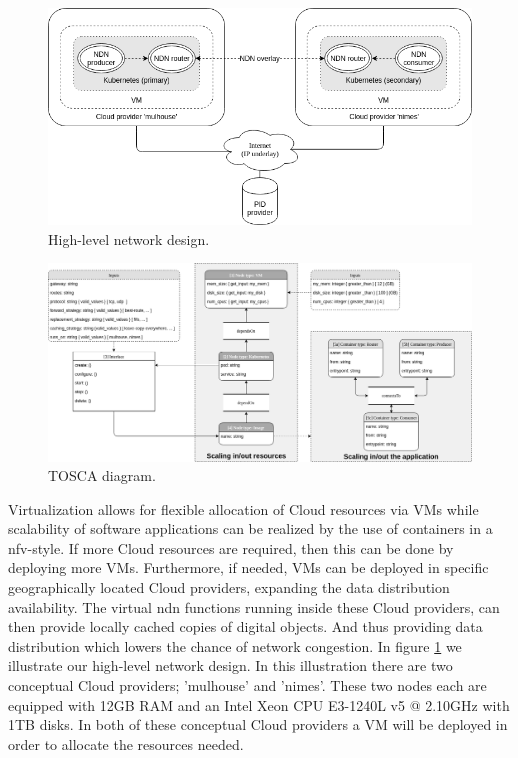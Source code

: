 \documentclass[conference]{IEEEtran}
\begin{document}
\begin{figure}[H]
\centering
\includegraphics[width=\columnwidth]{images/high-level-network-design.png}
\caption{High-level network design.}
\label{fig:high-level-network-design}
\end{figure}

\begin{figure}[ht]
\centering
\includegraphics[width=\textwidth]{images/tosca-diagram.png}
\caption{TOSCA diagram.}
\label{fig:tosca-diagram}
\end{figure}

Virtualization allows for flexible allocation of Cloud resources via VMs while scalability of software applications can be realized by the use of containers in a \gls{nfv}-style. If more Cloud resources are required, then this can be done by deploying more VMs. Furthermore, if needed, VMs can be deployed in specific geographically located Cloud providers, expanding the data distribution availability. The virtual \gls{ndn} functions running inside these Cloud providers, can then provide locally cached copies of digital objects. And thus providing data distribution which lowers the chance of network congestion. In figure \ref{fig:high-level-network-design} we illustrate our high-level network design. In this illustration there are two conceptual Cloud providers; 'mulhouse' and 'nimes'. These two nodes each are equipped with 12GB RAM and an Intel Xeon CPU E3-1240L v5 @ 2.10GHz with 1TB disks. In both of these conceptual Cloud providers a VM will be deployed in order to allocate the resources needed.
\end{document}
